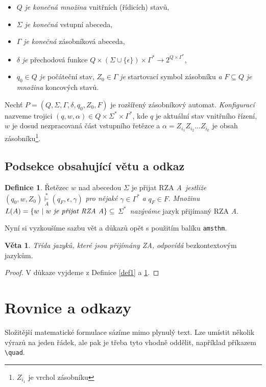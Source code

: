 \documentclass[a4paper, 11pt, twocolumn]{article}
\theoremstyle{definition}
\newtheorem{definition}{Definice}
\newtheorem{sentence}{Věta}
\begin{document}
\begin{itemize}
    \item $Q$ \emph{je konečná množina} vnitřních (řídicích) stavů,
    \item $\Sigma$ \emph{je konečná} vstupní abeceda,
    \item $\Gamma$ \emph{je konečná} zásobníková abeceda,
    \item $\delta$ \emph{je} přechodová funkce $Q \times(\Sigma \cup \{\epsilon\}) \times \Gamma^{*} \rightarrow 2^{Q \times \Gamma^{*}}$,
    \item $q_{0} \in Q$ \emph{je} počáteční stav, $Z_{0} \in \Gamma$ \emph{je} startovací symbol zásobníku \emph{a} $F \subseteq Q$ \emph{je množina} koncových stavů.
\end{itemize}

Nechť $P=\left(Q, \Sigma, \Gamma, \delta, q_{0}, Z_{0}, F\right)$ je rozšířený zásobníkový automat. \emph{Konfigurací} nazveme trojici 
$(q, w, \alpha) \in Q \times \Sigma^{*} \times \Gamma^{*}$, kde $q$ je aktuální stav vnitřního řízení, $w$ je dosud nezpracovaná část vstupního řetězce a 
$\alpha = Z_{i_{1}} Z_{i_{2}} \ldots Z_{i_{k}}$ je obsah zásobníku\footnote[1]{$Z_{i_{1}}$ je vrchol zásobníku}.

\subsection{Podsekce obsahující větu a odkaz}
\begin{definition} \label{def2} 
Řetězec $w$ nad abecedou $\Sigma$ je přijat RZA \emph{A~jestliže} $(q_{0}, w, Z_{0}) \overset{*}{\underset{A}\vdash} 
(q_{F}, \epsilon, \gamma)$ \emph{pro nějaké} $\gamma \in \Gamma^{*}$ \emph{a} $q_{F} \in F$. \emph{Množinu} $L(A)=\{w~|~w~\emph{je přijat RZA A}\} \subseteq$
$\Sigma^{*}$~\emph{nazýváme} jazyk přijímaný RZA \emph{A}.
\end{definition}

Nyní si vyzkoušíme sazbu vět a důkazů opět s použitím balíku \verb$amsthm$.

\begin{sentence} 
\emph{Třída jazyků, které jsou přijímány ZA, odpovídá} bezkontextovým jazykům.
\end{sentence}

\begin{proof}
V důkaze vyjdeme z Definice \ref{def1} a \ref{def2}.
\end{proof}

\section{Rovnice a odkazy}
Složitější matematické formulace sázíme mimo plynulý text. Lze umístit několik výrazů na jeden řádek, ale pak je třeba tyto vhodně oddělit, například příkazem
\verb$\quad$.
\end{document}
